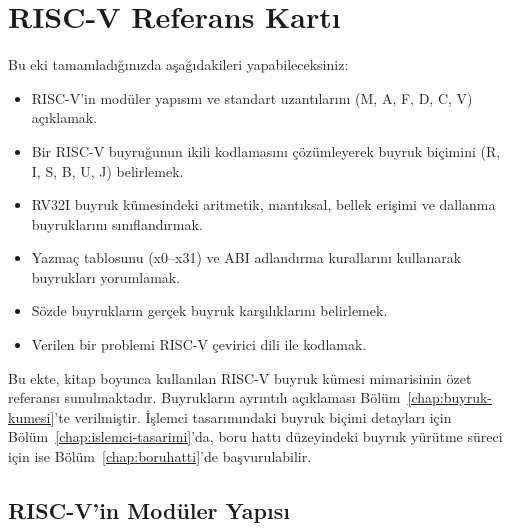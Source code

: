 \chapter{RISC-V Referans Kartı}
\label{app:risc-v-referans}

\begin{tcolorbox}[
    colback=blokyesil!15,
    colframe=sinyalyesil!60!black,
    title={\textbf{Öğrenme Hedefleri}},
    fonttitle=\bfseries,
    rounded corners,
    boxrule=0.8pt
]
Bu eki tamamladığınızda aşağıdakileri yapabileceksiniz:
\begin{itemize}[nosep, leftmargin=*]
    \item RISC-V'in modüler yapısını ve standart uzantılarını (M, A, F, D, C, V) açıklamak.
    \item Bir RISC-V buyruğunun ikili kodlamasını çözümleyerek buyruk biçimini (R, I, S, B, U, J) belirlemek.
    \item RV32I buyruk kümesindeki aritmetik, mantıksal, bellek erişimi ve dallanma buyruklarını sınıflandırmak.
    \item Yazmaç tablosunu (x0--x31) ve ABI adlandırma kurallarını kullanarak buyrukları yorumlamak.
    \item Sözde buyrukların gerçek buyruk karşılıklarını belirlemek.
    \item Verilen bir problemi RISC-V çevirici dili ile kodlamak.
\end{itemize}
\end{tcolorbox}

Bu ekte, kitap boyunca kullanılan RISC-V buyruk kümesi mimarisinin özet referansı sunulmaktadır. Buyrukların ayrıntılı açıklaması Bölüm~\ref{chap:buyruk-kumesi}'te verilmiştir. İşlemci tasarımındaki buyruk biçimi detayları için Bölüm~\ref{chap:islemci-tasarimi}'da, boru hattı düzeyindeki buyruk yürütme süreci için ise Bölüm~\ref{chap:boruhatti}'de başvurulabilir.

\section{RISC-V'in Modüler Yapısı}
\label{sec:ekc-moduler-yapi}

